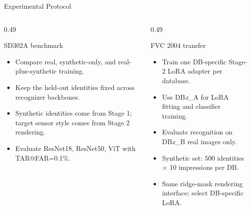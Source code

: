 \documentclass[aspectratio=169,10pt]{beamer}
\begin{document}
\begin{frame}{Experimental Protocol}
  \begin{columns}[T,onlytextwidth]
    \begin{column}{0.49\textwidth}
      \begin{block}{SD302A benchmark}
        \begin{itemize}
          \item Compare real, synthetic-only, and real-plus-synthetic training.
          \item Keep the held-out identities fixed across recognizer backbones.
          \item Synthetic identities come from Stage 1; target sensor style
          comes from Stage 2 rendering.
          \item Evaluate ResNet18, ResNet50, ViT with TAR@FAR=0.1\%.
        \end{itemize}
      \end{block}
    \end{column}
    \begin{column}{0.49\textwidth}
      \begin{block}{FVC 2004 transfer}
        \begin{itemize}
          \item Train one DB-specific Stage-2 LoRA adapter per database.
          \item Use DB\emph{x}\_A for LoRA fitting and classifier training.
          \item Evaluate recognition on DB\emph{x}\_B real images only.
          \item Synthetic set: 500 identities $\times$ 10 impressions per DB.
          \item Same ridge-mask rendering interface; select DB-specific LoRA.
        \end{itemize}
      \end{block}
    \end{column}
  \end{columns}
\end{frame}
\end{document}
